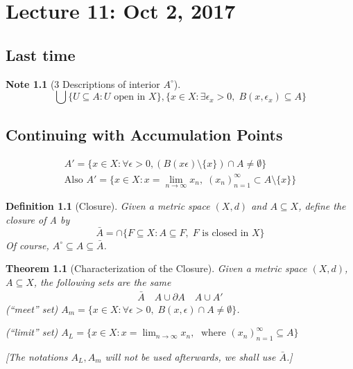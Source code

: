 \documentclass[11pt, oneside]{book}
\theoremstyle{break}
\newtheorem{thm}{Theorem}[section]
\newtheorem*{note}{Note}
\newtheorem{defn}{Definition}[section]
\begin{document}
\chapter{Lecture 11: Oct 2, 2017}\label{chp:lec11}

\section{Last time}

\begin{note}[3 Descriptions of interior $A^\circ$]
	\begin{equation*}
		\bigcup \{U \subseteq A : U \text{ open in } X\}, \{x \in X : \exists \epsilon_x > 0, \; B(x, \epsilon_x) \subseteq A \}
	\end{equation*}
\end{note}

\section{Continuing with Accumulation Points}\label{sect:accumulation points cont}

\begin{gather*}
	A' = \{x \in X : \forall \epsilon > 0, \left( B(x \epsilon) \setminus \{x \} \right) \cap A \neq \emptyset \} \\
	\text{Also } A' = \{x \in X : x = \lim_{n \to \infty} x_n, \; (x_n)_{n = 1}^\infty \subset A \setminus \{x \} \}
\end{gather*}

\begin{defn}[Closure]
	Given a metric space $(X, d)$ and $A \subseteq X$, define the closure of A by
	\begin{equation}
		\bar{A} = \cap \{F \subseteq X : A \subseteq F, \; F \text{ is closed in } X\}
	\end{equation}
	Of course, $A^\circ \subseteq A \subseteq \bar{A}$.
\end{defn}

\begin{thm}[Characterization of the Closure]
	Given a metric space $(X, d)$, $A \subseteq X$, the following sets are the same
	\begin{gather}
		\bar{A} \quad A \cup \partial A \quad A \cup A'
	\end{gather}
	(``meet'' set) $A_m = \{x \in X : \forall \epsilon > 0, \; B(x, \epsilon) \cap A \neq \emptyset \}$.

	(``limit'' set) $A_L = \{x \in X : x = \lim_{n \to \infty} x_n , \; \text{ where } (x_n)_{n = 1}^\infty \subseteq A \}$

	[The notations $A_L, A_m$ will not be used afterwards, we shall use $\bar{A}$.]
\end{thm}
\end{document}

